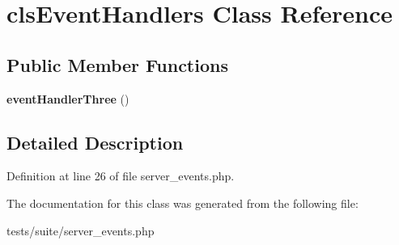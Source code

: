 \hypertarget{classclsEventHandlers}{
\section{clsEventHandlers Class Reference}
\label{classclsEventHandlers}
}
\subsection*{Public Member Functions}
\begin{DoxyCompactItemize}
\item 
\hypertarget{classclsEventHandlers_ad7c1bfbc772d852356aa0ec244a88254}{
{\bfseries eventHandlerThree} ()}
\label{classclsEventHandlers_ad7c1bfbc772d852356aa0ec244a88254}

\end{DoxyCompactItemize}


\subsection{Detailed Description}


Definition at line 26 of file server\_\-events.php.



The documentation for this class was generated from the following file:\begin{DoxyCompactItemize}
\item 
tests/suite/server\_\-events.php\end{DoxyCompactItemize}
